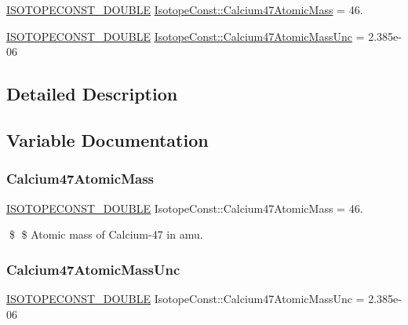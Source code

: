 \begin{DoxyCompactItemize}
\item 
\mbox{\hyperlink{group___isotope_const-_macros_ga8f45a7272ce02c0b4c65c44636ed719a}{I\+S\+O\+T\+O\+P\+E\+C\+O\+N\+S\+T\+\_\+\+D\+O\+U\+B\+LE}} \mbox{\hyperlink{group___isotope_const-_calcium-_ca47_ga9451bcea760801303c4301f13ed1b766}{Isotope\+Const\+::\+Calcium47\+Atomic\+Mass}} = 46.
\item 
\mbox{\hyperlink{group___isotope_const-_macros_ga8f45a7272ce02c0b4c65c44636ed719a}{I\+S\+O\+T\+O\+P\+E\+C\+O\+N\+S\+T\+\_\+\+D\+O\+U\+B\+LE}} \mbox{\hyperlink{group___isotope_const-_calcium-_ca47_ga0293a560c3cbfbdb19df31387f2e0507}{Isotope\+Const\+::\+Calcium47\+Atomic\+Mass\+Unc}} = 2.\+385e-\/06
\end{DoxyCompactItemize}


\subsection{Detailed Description}


\subsection{Variable Documentation}
\mbox{\label{group___isotope_const-_calcium-_ca47_ga9451bcea760801303c4301f13ed1b766}} 
\subsubsection{\texorpdfstring{Calcium47\+Atomic\+Mass}{Calcium47AtomicMass}}
{\footnotesize\ttfamily \mbox{\hyperlink{group___isotope_const-_macros_ga8f45a7272ce02c0b4c65c44636ed719a}{I\+S\+O\+T\+O\+P\+E\+C\+O\+N\+S\+T\+\_\+\+D\+O\+U\+B\+LE}} Isotope\+Const\+::\+Calcium47\+Atomic\+Mass = 46.}

\$ \$ Atomic mass of Calcium-\/47 in amu. \mbox{\label{group___isotope_const-_calcium-_ca47_ga0293a560c3cbfbdb19df31387f2e0507}} 
\subsubsection{\texorpdfstring{Calcium47\+Atomic\+Mass\+Unc}{Calcium47AtomicMassUnc}}
{\footnotesize\ttfamily \mbox{\hyperlink{group___isotope_const-_macros_ga8f45a7272ce02c0b4c65c44636ed719a}{I\+S\+O\+T\+O\+P\+E\+C\+O\+N\+S\+T\+\_\+\+D\+O\+U\+B\+LE}} Isotope\+Const\+::\+Calcium47\+Atomic\+Mass\+Unc = 2.\+385e-\/06}

